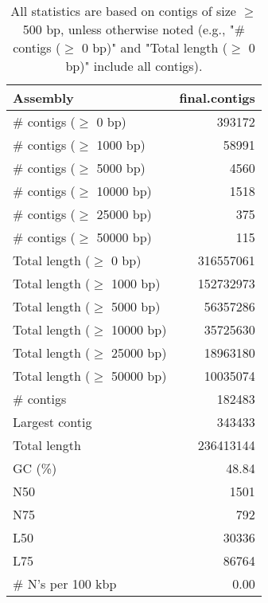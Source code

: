 \documentclass[12pt,a4paper]{article}
\begin{document}
\begin{table}[ht]
\begin{center}
\caption{All statistics are based on contigs of size $\geq$ 500 bp, unless otherwise noted (e.g., "\# contigs ($\geq$ 0 bp)" and "Total length ($\geq$ 0 bp)" include all contigs).}
\begin{tabular}{|l*{1}{|r}|}
\hline
Assembly & final.contigs \\ \hline
\# contigs ($\geq$ 0 bp) & 393172 \\ \hline
\# contigs ($\geq$ 1000 bp) & 58991 \\ \hline
\# contigs ($\geq$ 5000 bp) & 4560 \\ \hline
\# contigs ($\geq$ 10000 bp) & 1518 \\ \hline
\# contigs ($\geq$ 25000 bp) & 375 \\ \hline
\# contigs ($\geq$ 50000 bp) & 115 \\ \hline
Total length ($\geq$ 0 bp) & 316557061 \\ \hline
Total length ($\geq$ 1000 bp) & 152732973 \\ \hline
Total length ($\geq$ 5000 bp) & 56357286 \\ \hline
Total length ($\geq$ 10000 bp) & 35725630 \\ \hline
Total length ($\geq$ 25000 bp) & 18963180 \\ \hline
Total length ($\geq$ 50000 bp) & 10035074 \\ \hline
\# contigs & 182483 \\ \hline
Largest contig & 343433 \\ \hline
Total length & 236413144 \\ \hline
GC (\%) & 48.84 \\ \hline
N50 & 1501 \\ \hline
N75 & 792 \\ \hline
L50 & 30336 \\ \hline
L75 & 86764 \\ \hline
\# N's per 100 kbp & 0.00 \\ \hline
\end{tabular}
\end{center}
\end{table}
\end{document}
